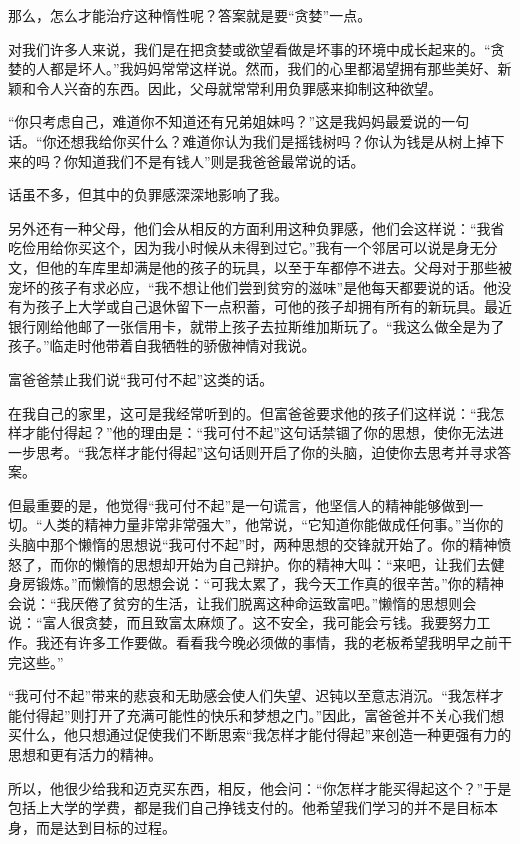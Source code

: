 那么，怎么才能治疗这种惰性呢？答案就是要“贪婪”一点。

对我们许多人来说，我们是在把贪婪或欲望看做是坏事的环境中成长起来的。“贪婪的人都是坏人。”我妈妈常常这样说。然而，我们的心里都渴望拥有那些美好、新颖和令人兴奋的东西。因此，父母就常常利用负罪感来抑制这种欲望。

“你只考虑自己，难道你不知道还有兄弟姐妹吗？”这是我妈妈最爱说的一句话。“你还想我给你买什么？难道你认为我们是摇钱树吗？你认为钱是从树上掉下来的吗？你知道我们不是有钱人”则是我爸爸最常说的话。

话虽不多，但其中的负罪感深深地影响了我。

另外还有一种父母，他们会从相反的方面利用这种负罪感，他们会这样说：“我省吃俭用给你买这个，因为我小时候从未得到过它。”我有一个邻居可以说是身无分文，但他的车库里却满是他的孩子的玩具，以至于车都停不进去。父母对于那些被宠坏的孩子有求必应，“我不想让他们尝到贫穷的滋味”是他每天都要说的话。他没有为孩子上大学或自己退休留下一点积蓄，可他的孩子却拥有所有的新玩具。最近银行刚给他邮了一张信用卡，就带上孩子去拉斯维加斯玩了。“我这么做全是为了孩子。”临走时他带着自我牺牲的骄傲神情对我说。

富爸爸禁止我们说“我可付不起”这类的话。

在我自己的家里，这可是我经常听到的。但富爸爸要求他的孩子们这样说：“我怎样才能付得起？”他的理由是：“我可付不起”这句话禁锢了你的思想，使你无法进一步思考。“我怎样才能付得起”这句话则开启了你的头脑，迫使你去思考并寻求答案。

但最重要的是，他觉得“我可付不起”是一句谎言，他坚信人的精神能够做到一切。“人类的精神力量非常非常强大”，他常说，“它知道你能做成任何事。”当你的头脑中那个懒惰的思想说“我可付不起”时，两种思想的交锋就开始了。你的精神愤怒了，而你的懒惰的思想却开始为自己辩护。你的精神大叫：“来吧，让我们去健身房锻炼。”而懒惰的思想会说：“可我太累了，我今天工作真的很辛苦。”你的精神会说：“我厌倦了贫穷的生活，让我们脱离这种命运致富吧。”懒惰的思想则会说：“富人很贪婪，而且致富太麻烦了。这不安全，我可能会亏钱。我要努力工作。我还有许多工作要做。看看我今晚必须做的事情，我的老板希望我明早之前干完这些。”

“我可付不起”带来的悲哀和无助感会使人们失望、迟钝以至意志消沉。“我怎样才能付得起”则打开了充满可能性的快乐和梦想之门。”因此，富爸爸并不关心我们想买什么，他只想通过促使我们不断思索“我怎样才能付得起”来创造一种更强有力的思想和更有活力的精神。

所以，他很少给我和迈克买东西，相反，他会问：“你怎样才能买得起这个？”于是包括上大学的学费，都是我们自己挣钱支付的。他希望我们学习的并不是目标本身，而是达到目标的过程。

